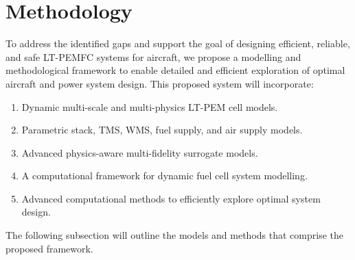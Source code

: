 \section{Methodology} \label{sec:method}

To address the identified gaps and support the goal of designing efficient, reliable, and safe LT-PEMFC systems for aircraft, we propose a modelling and methodological framework to enable detailed and efficient exploration of optimal aircraft and power system design. This proposed system will incorporate:
\begin{enumerate}
	\item Dynamic multi-scale and multi-physics LT-PEM cell models.
	\item Parametric stack, TMS, WMS, fuel supply, and air supply models.
	\item Advanced physics-aware multi-fidelity surrogate models.
	\item A computational framework for dynamic fuel cell system modelling.
	\item Advanced computational methods to efficiently explore optimal system design.
\end{enumerate}
The following subsection will outline the models and methods that comprise the proposed framework.

